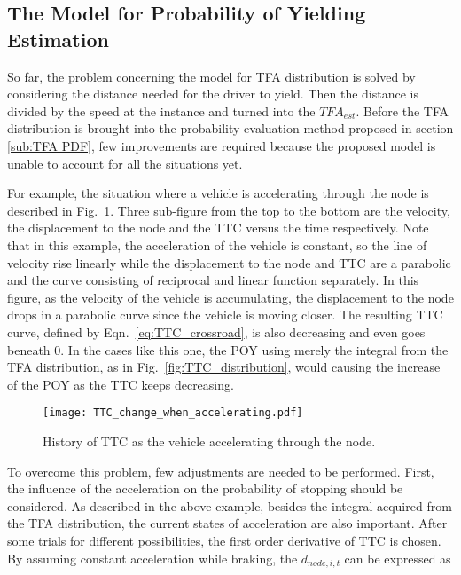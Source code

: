 \subsection{The Model for Probability of Yielding Estimation}
So far, the problem concerning the model for TFA distribution is solved by considering the distance needed for the driver to yield. Then the distance is divided by the speed at the instance and turned into the ${TFA}_{est}$. Before the TFA distribution is brought into the probability evaluation method proposed in section \ref{sub:TFA PDF}, few improvements are required because the proposed model is unable to account for all the situations yet. 

For example, the situation where a vehicle is accelerating through the node is described in Fig.~\ref{fig:TTC_acc}. Three sub-figure from the top to the bottom are the velocity, the displacement to the node and the TTC versus the time respectively. Note that in this example, the acceleration of the vehicle is constant, so the line of velocity rise linearly while the displacement to the node and TTC are a parabolic and the curve consisting of reciprocal and linear function separately. In this figure, as the velocity of the vehicle is accumulating, the displacement to the node drops in a parabolic curve since the vehicle is moving closer. The resulting TTC curve, defined by Eqn.~\ref{eq:TTC_crossroad}, is also decreasing and even goes beneath 0. In the cases like this one, the POY using merely the integral from the TFA distribution, as in Fig.~\ref{fig:TTC_distribution}, would causing the increase of the POY as the TTC keeps decreasing.

\begin{figure}[htbp!]
\begin{center}
\texttt{[image: TTC\_change\_when\_accelerating.pdf]}
\end{center}
\caption{History of TTC as the vehicle accelerating through the node.}
\label{fig:TTC_acc} 
\end{figure}

To overcome this problem, few adjustments are needed to be performed. First, the influence of the acceleration on the probability of stopping should be considered. As described in the above example, besides the integral acquired from the TFA distribution, the current states of acceleration are also important. After some trials for different possibilities, the first order derivative of TTC is chosen. By assuming constant acceleration while braking, the $d_{node, i, t}$ can be expressed as

